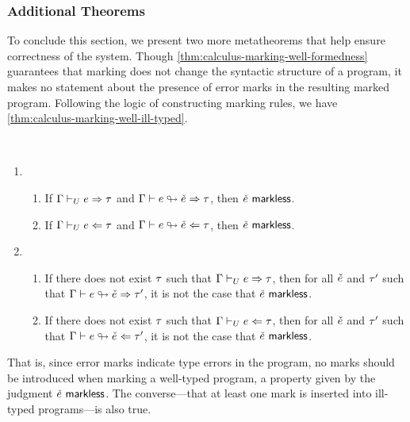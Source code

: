 
\subsubsection{Additional Theorems}
To conclude this section, we present two more metatheorems that help ensure correctness of the
system. Though \cref{thm:calculus-marking-well-formedness} guarantees that marking does not change
the syntactic structure of a program, it makes no statement about the presence of error marks in the
resulting marked program. Following the logic of constructing marking rules, we have
\cref{thm:calculus-marking-well-ill-typed}.

\begin{theorem}[name=Marking of Well-Typed/Ill-Typed Expressions] \ %
  \label{thm:calculus-marking-well-ill-typed}
  \begin{enumerate}
    \item \begin{enumerate}
        \item If $\Gamma \vdash_{U} e \Rightarrow \tau$ and $\Gamma \vdash e \looparrowright \check{e} \Rightarrow \tau$,
          then $\check{e} ~{\normalfont\textsf{markless}}$.
        \item If $\Gamma \vdash_{U} e \Leftarrow \tau$ and $\Gamma \vdash e \looparrowright \check{e} \Leftarrow \tau$,
          then $\check{e} ~{\normalfont\textsf{markless}}$.
      \end{enumerate}

    \item \begin{enumerate}
        \item If there does not exist $\tau$ such that $\Gamma \vdash_{U} e \Rightarrow \tau$, then for
          all $\check{e}$ and $\tau'$ such that $\Gamma \vdash e \looparrowright \check{e} \Rightarrow \tau'$, it is not
          the case that $\check{e} ~{\normalfont\textsf{markless}}$.
        \item If there does not exist $\tau$ such that $\Gamma \vdash_{U} e \Leftarrow \tau$, then for
          all $\check{e}$ and $\tau'$ such that $\Gamma \vdash e \looparrowright \check{e} \Leftarrow \tau'$, it is not
          the case that $\check{e} ~{\normalfont\textsf{markless}}$.
      \end{enumerate}
  \end{enumerate}
\end{theorem}
%
That is, since error marks indicate type errors in the program, no marks should be introduced
when marking a well-typed program, a property given by the judgment $\check{e} ~{\normalfont\textsf{markless}}$. The
converse---that at least one mark is inserted into ill-typed programs---is also true.

